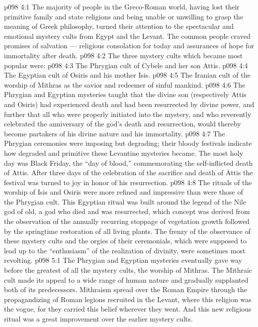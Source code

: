 \vs p098 4:1 The majority of people in the Greco\hyp{}Roman world, having lost their primitive family and state religions and being unable or unwilling to grasp the meaning of Greek philosophy, turned their attention to the spectacular and emotional mystery cults from Egypt and the Levant. The common people craved promises of salvation --- religious consolation for today and assurances of hope for immortality after death.
\vs p098 4:2 The three mystery cults which became most popular were:
\vs p098 4:3 \bibnobreakspace The Phrygian cult of Cybele and her son Attis.
\vs p098 4:4 \bibnobreakspace The Egyptian cult of Osiris and his mother Isis.
\vs p098 4:5 \bibnobreakspace The Iranian cult of the worship of Mithras as the savior and redeemer of sinful mankind.
\vs p098 4:6 \pc The Phrygian and Egyptian mysteries taught that the divine son (respectively Attis and Osiris) had experienced death and had been resurrected by divine power, and further that all who were properly initiated into the mystery, and who reverently celebrated the anniversary of the god’s death and resurrection, would thereby become partakers of his divine nature and his immortality.
\vs p098 4:7 \pc The Phrygian ceremonies were imposing but degrading; their bloody festivals indicate how degraded and primitive these Levantine mysteries became. The most holy day was Black Friday, the “day of blood,” commemorating the self\hyp{}inflicted death of Attis. After three days of the celebration of the sacrifice and death of Attis the festival was turned to joy in honor of his resurrection.
\vs p098 4:8 The rituals of the worship of Isis and Osiris were more refined and impressive than were those of the Phrygian cult. This Egyptian ritual was built around the legend of the Nile god of old, a god who died and was resurrected, which concept was derived from the observation of the annually recurring stoppage of vegetation growth followed by the springtime restoration of all living plants. The frenzy of the observance of these mystery cults and the orgies of their ceremonials, which were supposed to lead up to the “enthusiasm” of the realization of divinity, were sometimes most revolting.
\vs p098 5:1 The Phrygian and Egyptian mysteries eventually gave way before the greatest of all the mystery cults, the worship of Mithras. The Mithraic cult made its appeal to a wide range of human nature and gradually supplanted both of its predecessors. Mithraism spread over the Roman Empire through the propagandizing of Roman legions recruited in the Levant, where this religion was the vogue, for they carried this belief wherever they went. And this new religious ritual was a great improvement over the earlier mystery cults.
